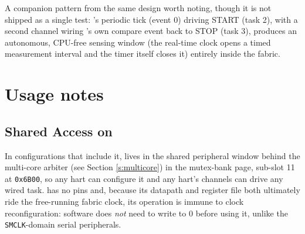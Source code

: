 A companion pattern from the same design worth noting, though it is not shipped as a single test: 's periodic tick (event 0) driving  START (task 2), with a second channel wiring 's own compare event back to  STOP (task 3), produces an autonomous, CPU-free sensing window (the real-time clock opens a timed measurement interval and the timer itself closes it) entirely inside the fabric.

\section{Usage notes}

\subsection{Shared Access on \AsicNameForUserGuide}
\label{s:evfab-shared}

In configurations that include it,  lives in the shared peripheral window behind the multi-core arbiter (see Section \ref{s:multicore}) in the mutex-bank page, sub-slot 11 at \texttt{0x6B00}, so any hart can configure it and any hart's channels can drive any wired task.  has no pins and, because its datapath and register file both ultimately ride the free-running fabric clock, its operation is immune to clock reconfiguration: software does \emph{not} need to write  to 0 before using it, unlike the \texttt{SMCLK}-domain serial peripherals.

